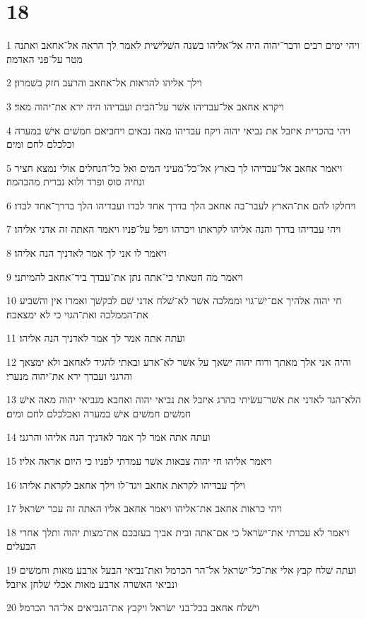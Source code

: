 \chapter{18}

\par 1 ויהי ימים רבים ודבר־יהוה היה אל־אליהו בשׁנה השׁלישׁית לאמר לך הראה אל־אחאב ואתנה מטר על־פני האדמה׃
\par 2 וילך אליהו להראות אל־אחאב והרעב חזק בשׁמרון׃
\par 3 ויקרא אחאב אל־עבדיהו אשׁר על־הבית ועבדיהו היה ירא את־יהוה מאד׃
\par 4 ויהי בהכרית איזבל את נביאי יהוה ויקח עבדיהו מאה נבאים ויחביאם חמשׁים אישׁ במערה וכלכלם לחם ומים׃
\par 5 ויאמר אחאב אל־עבדיהו לך בארץ אל־כל־מעיני המים ואל כל־הנחלים אולי נמצא חציר ונחיה סוס ופרד ולוא נכרית מהבהמה׃
\par 6 ויחלקו להם את־הארץ לעבר־בה אחאב הלך בדרך אחד לבדו ועבדיהו הלך בדרך־אחד לבדו׃
\par 7 ויהי עבדיהו בדרך והנה אליהו לקראתו ויכרהו ויפל על־פניו ויאמר האתה זה אדני אליהו׃
\par 8 ויאמר לו אני לך אמר לאדניך הנה אליהו׃
\par 9 ויאמר מה חטאתי כי־אתה נתן את־עבדך ביד־אחאב להמיתני׃
\par 10 חי יהוה אלהיך אם־ישׁ־גוי וממלכה אשׁר לא־שׁלח אדני שׁם לבקשׁך ואמרו אין והשׁביע את־הממלכה ואת־הגוי כי לא ימצאכה׃
\par 11 ועתה אתה אמר לך אמר לאדניך הנה אליהו׃
\par 12 והיה אני אלך מאתך ורוח יהוה ישׂאך על אשׁר לא־אדע ובאתי להגיד לאחאב ולא ימצאך והרגני ועבדך ירא את־יהוה מנערי׃
\par 13 הלא־הגד לאדני את אשׁר־עשׂיתי בהרג איזבל את נביאי יהוה ואחבא מנביאי יהוה מאה אישׁ חמשׁים חמשׁים אישׁ במערה ואכלכלם לחם ומים׃
\par 14 ועתה אתה אמר לך אמר לאדניך הנה אליהו והרגני׃
\par 15 ויאמר אליהו חי יהוה צבאות אשׁר עמדתי לפניו כי היום אראה אליו׃
\par 16 וילך עבדיהו לקראת אחאב ויגד־לו וילך אחאב לקראת אליהו׃
\par 17 ויהי כראות אחאב את־אליהו ויאמר אחאב אליו האתה זה עכר ישׂראל׃
\par 18 ויאמר לא עכרתי את־ישׂראל כי אם־אתה ובית אביך בעזבכם את־מצות יהוה ותלך אחרי הבעלים׃
\par 19 ועתה שׁלח קבץ אלי את־כל־ישׂראל אל־הר הכרמל ואת־נביאי הבעל ארבע מאות וחמשׁים ונביאי האשׁרה ארבע מאות אכלי שׁלחן איזבל׃
\par 20 וישׁלח אחאב בכל־בני ישׂראל ויקבץ את־הנביאים אל־הר הכרמל׃
